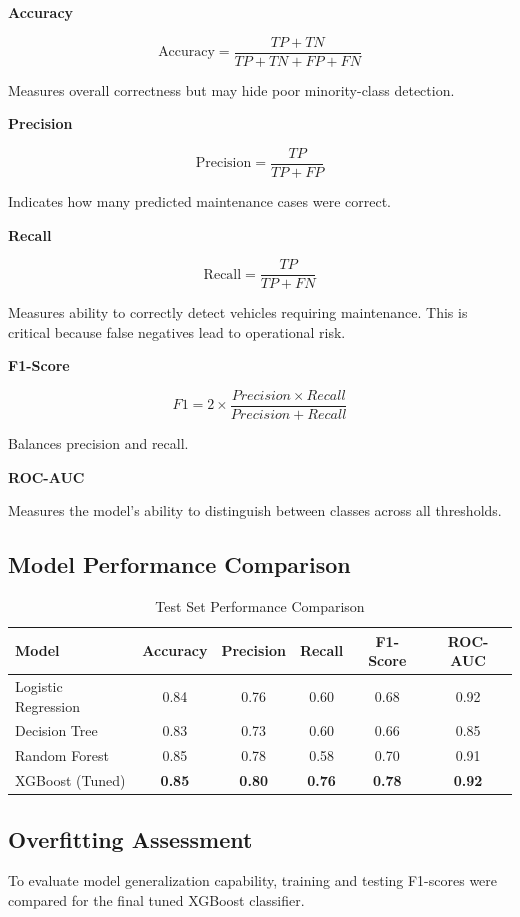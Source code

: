 \documentclass[12pt, a4paper]{article}
\begin{document}
\textbf{Accuracy}

\[
\text{Accuracy} = \frac{TP + TN}{TP + TN + FP + FN}
\]

Measures overall correctness but may hide poor minority-class detection.

\textbf{Precision}

\[
\text{Precision} = \frac{TP}{TP + FP}
\]

Indicates how many predicted maintenance cases were correct.

\textbf{Recall}

\[
\text{Recall} = \frac{TP}{TP + FN}
\]

Measures ability to correctly detect vehicles requiring maintenance. This is critical because false negatives lead to operational risk.

\textbf{F1-Score}

\[
F1 = 2 \times \frac{Precision \times Recall}{Precision + Recall}
\]

Balances precision and recall.

\textbf{ROC-AUC}

Measures the model's ability to distinguish between classes across all thresholds.

\subsection{Model Performance Comparison}

\begin{table}[H]
\centering
\caption{Test Set Performance Comparison}
\begin{tabular}{lccccc}
\toprule
Model & Accuracy & Precision & Recall & F1-Score & ROC-AUC \\
\midrule
Logistic Regression & 0.84 & 0.76 & 0.60 & 0.68 & 0.92 \\
Decision Tree & 0.83 & 0.73 & 0.60 & 0.66 & 0.85 \\
Random Forest & 0.85 & 0.78 & 0.58 & 0.70 & 0.91 \\
\rowcolor{solarblue!8}
XGBoost (Tuned) & \textbf{0.85} & \textbf{0.80} & \textbf{0.76} & \textbf{0.78} & \textbf{0.92} \\
\bottomrule
\end{tabular}
\end{table}
\subsection{Overfitting Assessment}

To evaluate model generalization capability, training and testing F1-scores were compared for the final tuned XGBoost classifier.
\end{document}
